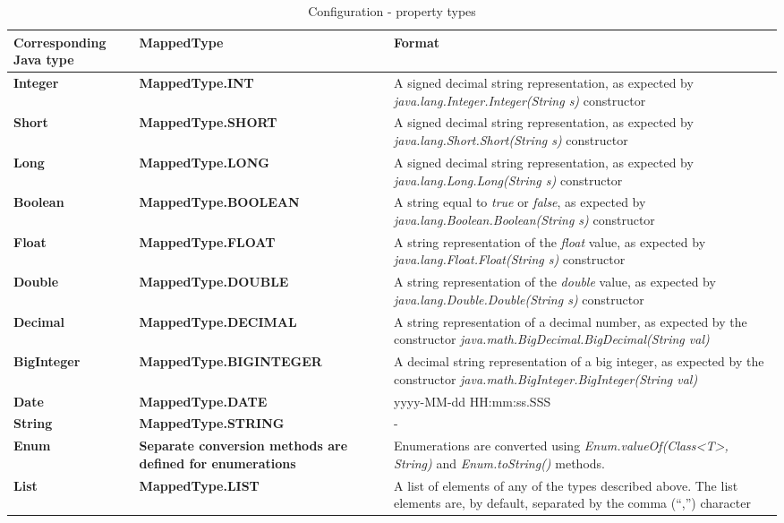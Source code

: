 \begin{table}
\scriptsize
\begin{center}
\begin{tabular}{p{3.5cm} p{4.0cm} p{7.0cm}}
	\hline
	\textbf{Corresponding Java type}	& \textbf{MappedType}					& \textbf{Format}					\\[1mm]
    \hline
	\textbf{Integer}			& \textbf{MappedType.INT}			& A signed decimal string representation, as expected by \emph{java.lang.Integer.Integer(String s)} constructor 				\\[1.5mm]
    \textbf{Short}				& \textbf{MappedType.SHORT}			& A signed decimal string representation, as expected by \emph{java.lang.Short.Short(String s)} constructor				\\[1.5mm]
	\textbf{Long}				& \textbf{MappedType.LONG}			& A signed decimal string representation, as expected by \emph{java.lang.Long.Long(String s)} constructor				\\[1.5mm]
	\textbf{Boolean}			& \textbf{MappedType.BOOLEAN}		& A string equal to \emph{true} or \emph{false}, as expected by \emph{java.lang.Boolean.Boolean(String s)} constructor	\\[1.5mm]
	\textbf{Float}				& \textbf{MappedType.FLOAT}			& A string representation of the \emph{float} value, as expected by \emph{java.lang.Float.Float(String s)} constructor			\\[1.5mm]
	\textbf{Double}				& \textbf{MappedType.DOUBLE}		& A string representation of the \emph{double} value, as expected by \emph{java.lang.Double.Double(String s)} constructor			\\[1.5mm]
	\textbf{Decimal}			& \textbf{MappedType.DECIMAL}		& A string representation of a decimal number, as expected by the constructor \emph{java.math.BigDecimal.BigDecimal(String val)}		\\[1.5mm]
	\textbf{BigInteger}			& \textbf{MappedType.BIGINTEGER}	& A decimal string representation of a big integer, as expected by the constructor \emph{ java.math.BigInteger.BigInteger(String val)}	\\[1.5mm]
	\textbf{Date}				& \textbf{MappedType.DATE}			& yyyy-MM-dd HH:mm:ss.SSS						\\[1.5mm]
	\textbf{String}				& \textbf{MappedType.STRING}		& -												\\[1.5mm]
	\textbf{Enum}				& \textbf{Separate conversion methods are defined for enumerations}					& Enumerations are converted using \emph{Enum.valueOf(Class<T>, String)} and \emph{Enum.toString()} methods.							\\[1.5mm]
	\textbf{List}				& \textbf{MappedType.LIST}			& A list of elements of any of the types described above. The list elements are, by default, separated by the comma (``,'') character			\\[1.5mm]
    \hline
\end{tabular}
\end{center}
\caption{Configuration - property types}
\label{tab:libConfTypes}
\end{table}

